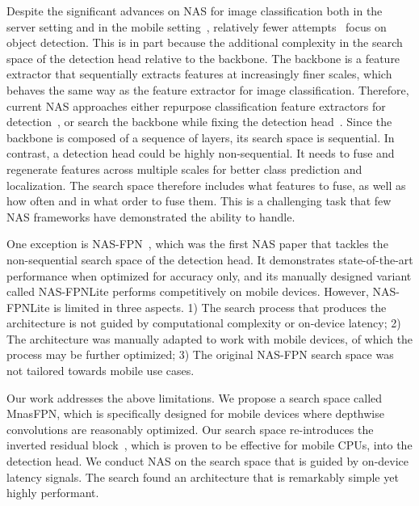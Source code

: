 \documentclass[10pt,twocolumn,letterpaper]{article}
\def\Mnasfpnnospace{MnasFPN}
\begin{document}
Despite the significant advances on NAS for image classification both in the server setting \cite{zoph2016neural, tan2019efficientnet} and in the mobile setting~\cite{tan2019mnasnet, cai2018proxylessnas, howard2019searching, wu2019fbnet, dai2019chamnet}, relatively fewer attempts~\cite{ghiasi2019fpn, chen2019detnas, wang2019nasfcos} focus on object detection. This is in part because the additional complexity in the search space of the detection head relative to the backbone. 
The backbone is a feature extractor that sequentially extracts features at increasingly finer scales, which behaves the same way as the feature extractor for image classification. Therefore, current NAS approaches either repurpose classification feature extractors for detection~\cite{howard2019searching, tan2019mnasnet, tan2019efficientnet}, or search the backbone while fixing the detection head~\cite{chen2019detnas}.
Since the backbone is composed of a sequence of layers, its search space is sequential. In contrast, a detection head could be highly non-sequential. It needs to fuse and regenerate features across multiple scales for better class prediction and localization. The search space therefore includes what features to fuse, as well as how often and in what order to fuse them. This is a challenging task that few NAS frameworks have demonstrated the ability to handle.

One exception is NAS-FPN~\cite{ghiasi2019fpn}, which was the first NAS paper that tackles the non-sequential search space of the detection head. It demonstrates state-of-the-art performance when optimized for accuracy only, and its manually designed variant called NAS-FPNLite performs competitively on mobile devices. However, NAS-FPNLite is limited in three aspects. 1) The search process that produces the architecture is not guided by computational complexity or on-device latency; 2) The architecture was manually adapted to work with mobile devices, of which the process may be further optimized; 3) The original NAS-FPN search space was not tailored towards mobile use cases. 

Our work addresses the above limitations. We propose a search space called \Mnasfpnnospace, which is specifically designed for mobile devices where depthwise convolutions are reasonably optimized. Our search space re-introduces the inverted residual block~\cite{sandler2018mobilenetv2}, which is proven to be effective for mobile CPUs, into the detection head. We conduct NAS on the search space that is guided by on-device latency signals. The search found an architecture that is remarkably simple yet highly performant.
\end{document}
